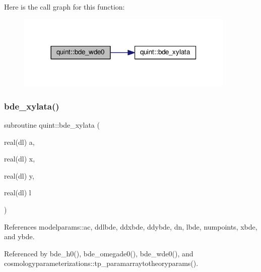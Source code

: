 Here is the call graph for this function\+:
\nopagebreak
\begin{figure}[H]
\begin{center}
\leavevmode
\includegraphics[width=296pt]{namespacequint_aab2e2c5f2a7e9e56f0852539b0933259_cgraph}
\end{center}
\end{figure}
\mbox{\label{namespacequint_a37db272f12e135ca0061bd66bfccab65}} 
\subsubsection{\texorpdfstring{bde\+\_\+xylata()}{bde\_xylata()}}
{\footnotesize\ttfamily subroutine quint\+::bde\+\_\+xylata (\begin{DoxyParamCaption}\item[{real(dl)}]{a,  }\item[{real(dl)}]{x,  }\item[{real(dl)}]{y,  }\item[{real(dl)}]{l }\end{DoxyParamCaption})}



References modelparams\+::ac, ddlbde, ddxbde, ddybde, dn, lbde, numpoints, xbde, and ybde.



Referenced by bde\+\_\+h0(), bde\+\_\+omegade0(), bde\+\_\+wde0(), and cosmologyparameterizations\+::tp\+\_\+paramarraytotheoryparams().


